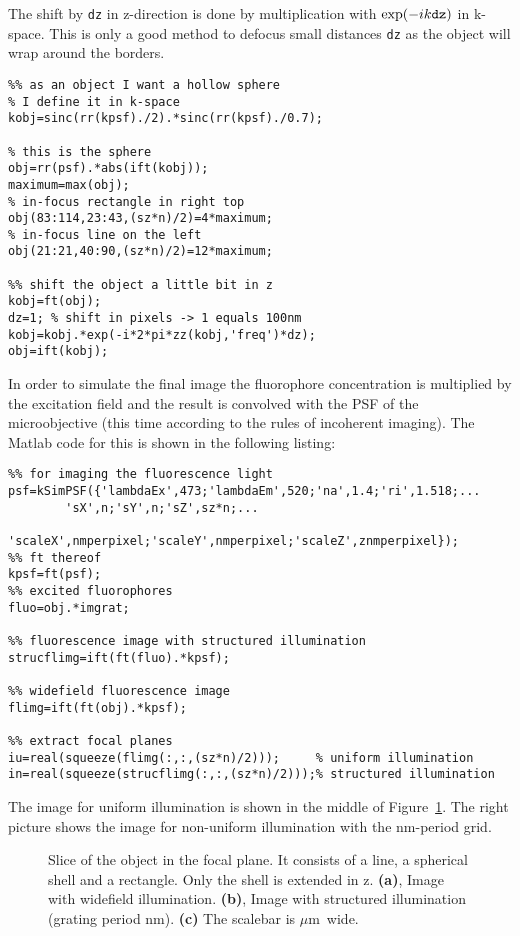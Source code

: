 \documentclass[11pt]{scrartcl}
\newcommand{\figref}[1]{Figure~\ref{#1}}
\begin{document}
The shift by {\tt dz} in z-direction is done by multiplication with
$\exp(-ik{\tt dz})$ in k-space. This is only a good method to defocus
small distances {\tt dz} as the object will wrap around the borders.

\begin{lstlisting}
%% as an object I want a hollow sphere
% I define it in k-space
kobj=sinc(rr(kpsf)./2).*sinc(rr(kpsf)./0.7);

% this is the sphere
obj=rr(psf).*abs(ift(kobj));
maximum=max(obj);
% in-focus rectangle in right top
obj(83:114,23:43,(sz*n)/2)=4*maximum;
% in-focus line on the left
obj(21:21,40:90,(sz*n)/2)=12*maximum;

%% shift the object a little bit in z
kobj=ft(obj);
dz=1; % shift in pixels -> 1 equals 100nm
kobj=kobj.*exp(-i*2*pi*zz(kobj,'freq')*dz);
obj=ift(kobj);
\end{lstlisting}

In order to simulate the final image the fluorophore concentration is
multiplied by the excitation field and the result is convolved with
the PSF of the microobjective (this time according to the rules of
incoherent imaging). The Matlab code for this is shown in the
following listing:
\begin{lstlisting}
%% for imaging the fluorescence light
psf=kSimPSF({'lambdaEx',473;'lambdaEm',520;'na',1.4;'ri',1.518;...
        'sX',n;'sY',n;'sZ',sz*n;...
        'scaleX',nmperpixel;'scaleY',nmperpixel;'scaleZ',znmperpixel});
%% ft thereof
kpsf=ft(psf);
%% excited fluorophores
fluo=obj.*imgrat;

%% fluorescence image with structured illumination
strucflimg=ift(ft(fluo).*kpsf);

%% widefield fluorescence image
flimg=ift(ft(obj).*kpsf);

%% extract focal planes
iu=real(squeeze(flimg(:,:,(sz*n)/2)));     % uniform illumination
in=real(squeeze(strucflimg(:,:,(sz*n)/2)));% structured illumination
\end{lstlisting}


The image for uniform illumination is shown in
the middle of \figref{fig:input}. The right picture shows the image
for non-uniform illumination with the \unit[600]{nm}-period grid.

\begin{figure}[htb]
  \centering
  \caption{Slice of the object in the focal plane. It consists of a
    line, a spherical shell and a rectangle. Only the shell is
    extended in z. {\bf(a)}, Image with widefield
    illumination. {\bf(b)}, Image with structured illumination
    (grating period \unit[600]{nm}). {\bf(c)} The scalebar is
    \unit[2]{$\mu$m} wide. }
  \label{fig:input}
\end{figure}
\end{document}
